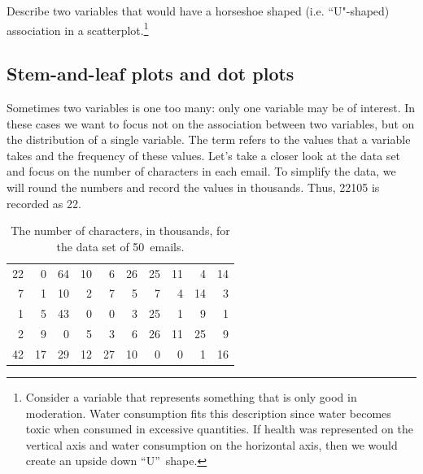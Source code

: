\begin{exercise}
Describe two variables that would have a horseshoe shaped (i.e. ``U"-shaped) association in a scatterplot.\footnote{Consider a variable that represents something that is only good in moderation. Water consumption fits this description since water becomes toxic when consumed in excessive quantities. If health was represented on the vertical axis and water consumption on the horizontal axis, then we would create an upside down ``U''~shape.}
\end{exercise}


\subsection{Stem-and-leaf plots and dot plots}
\label{dotPlot}

Sometimes two variables is one too many: only one variable may be of interest. In these cases we want to focus not on the association between two variables, but on the distribution of a single variable. The term  refers to the values that a variable takes and the frequency of these values. Let's take a closer look at the  data set and focus on the number of characters in each email. To simplify the data, we will round the numbers and record the values in thousands. Thus, 22105 is recorded as 22.

\setlength{\captionwidth}{0.9\textwidth}

\begin{table}[ht]
\centering
\begin{tabular}{rrrrrrrrrr}
  \hline
 22 & 0 & 64 & 10 & 6 & 26 & 25 & 11 & 4 & 14 \\
  7 & 1 & 10 & 2 & 7 & 5 & 7 & 4 & 14 & 3 \\
   1 & 5 & 43 & 0 & 0 & 3 & 25 & 1 & 9 & 1 \\
  2 & 9 & 0 & 5 & 3 & 6 & 26 & 11 & 25 & 9 \\
  42 & 17 & 29 & 12 & 27 & 10 & 0 & 0 & 1 & 16 \\
   \hline
\end{tabular}
\caption{The number of characters, in thousands, for the data set of 50~emails.}
\end{table}

\setlength{\captionwidth}{\mycaptionwidth}

